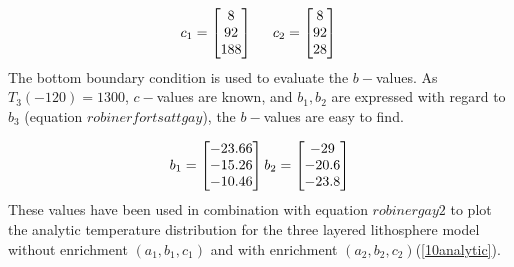 \documentclass[10pt,a4paper]{article}
\begin{document}
\begin{equation}
c_1=\begin{bmatrix}
8\\
92\\
188\\
\end{bmatrix}\\
\hspace{0.5cm}
c_2=\begin{bmatrix}
8\\
92\\
28\\
\end{bmatrix}\\
\vspace{0.5cm}
\end{equation}
The bottom boundary condition is used to evaluate the $b-$values. As$T_3(-120)=1300$, $c-$values are known, and $b_1,b_2$ are expressed with regard to $b_3$ (equation $robinerfortsattgay$), the $b-$values are easy to find.

\begin{equation}
b_1=\begin{bmatrix}
-23.66\\
-15.26\\
-10.46\\
\end{bmatrix}\\
\vspace{0.5cm}
b_2=\begin{bmatrix}
-29\\
-20.6\\
-23.8\\
\end{bmatrix}
\end{equation}
These values have been used in combination with equation $robinergay2$ to plot the analytic temperature distribution for the three layered lithosphere model without enrichment $(a_1,b_1,c_1)$ and with enrichment $(a_2,b_2,c_2)$(\ref{10analytic}). 
\end{document}
